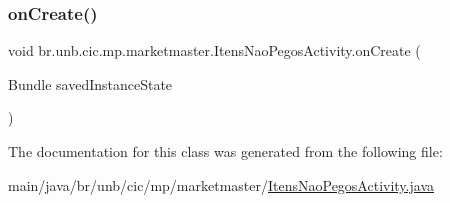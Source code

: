 \subsubsection{\texorpdfstring{on\+Create()}{onCreate()}}
{\footnotesize\ttfamily void br.\+unb.\+cic.\+mp.\+marketmaster.\+Itens\+Nao\+Pegos\+Activity.\+on\+Create (\begin{DoxyParamCaption}\item[{Bundle}]{saved\+Instance\+State }\end{DoxyParamCaption})\hspace{0.3cm}{\ttfamily [protected]}}



The documentation for this class was generated from the following file\+:\begin{DoxyCompactItemize}
\item 
main/java/br/unb/cic/mp/marketmaster/\mbox{\hyperlink{ItensNaoPegosActivity_8java}{Itens\+Nao\+Pegos\+Activity.\+java}}\end{DoxyCompactItemize}
